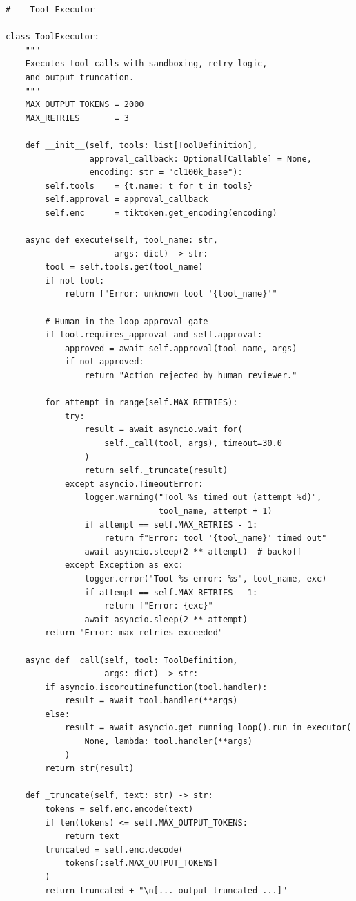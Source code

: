 \begin{lstlisting}[style=pythonstyle, caption={Production Agent Harness -- Core Implementation}]
# -- Tool Executor --------------------------------------------

class ToolExecutor:
    """
    Executes tool calls with sandboxing, retry logic,
    and output truncation.
    """
    MAX_OUTPUT_TOKENS = 2000
    MAX_RETRIES       = 3

    def __init__(self, tools: list[ToolDefinition],
                 approval_callback: Optional[Callable] = None,
                 encoding: str = "cl100k_base"):
        self.tools    = {t.name: t for t in tools}
        self.approval = approval_callback
        self.enc      = tiktoken.get_encoding(encoding)

    async def execute(self, tool_name: str,
                      args: dict) -> str:
        tool = self.tools.get(tool_name)
        if not tool:
            return f"Error: unknown tool '{tool_name}'"

        # Human-in-the-loop approval gate
        if tool.requires_approval and self.approval:
            approved = await self.approval(tool_name, args)
            if not approved:
                return "Action rejected by human reviewer."

        for attempt in range(self.MAX_RETRIES):
            try:
                result = await asyncio.wait_for(
                    self._call(tool, args), timeout=30.0
                )
                return self._truncate(result)
            except asyncio.TimeoutError:
                logger.warning("Tool %s timed out (attempt %d)",
                               tool_name, attempt + 1)
                if attempt == self.MAX_RETRIES - 1:
                    return f"Error: tool '{tool_name}' timed out"
                await asyncio.sleep(2 ** attempt)  # backoff
            except Exception as exc:
                logger.error("Tool %s error: %s", tool_name, exc)
                if attempt == self.MAX_RETRIES - 1:
                    return f"Error: {exc}"
                await asyncio.sleep(2 ** attempt)
        return "Error: max retries exceeded"

    async def _call(self, tool: ToolDefinition,
                    args: dict) -> str:
        if asyncio.iscoroutinefunction(tool.handler):
            result = await tool.handler(**args)
        else:
            result = await asyncio.get_running_loop().run_in_executor(
                None, lambda: tool.handler(**args)
            )
        return str(result)

    def _truncate(self, text: str) -> str:
        tokens = self.enc.encode(text)
        if len(tokens) <= self.MAX_OUTPUT_TOKENS:
            return text
        truncated = self.enc.decode(
            tokens[:self.MAX_OUTPUT_TOKENS]
        )
        return truncated + "\n[... output truncated ...]"


\end{lstlisting}
